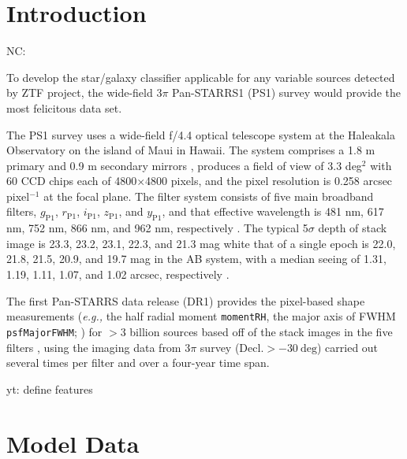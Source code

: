 \documentclass[twocolumn]{aastex62}
\newcommand{\yutaro}[1]{{\color{red} yt: {#1}}}
\newcommand{\NC}[1]{{\color{brown} NC: {#1}}}
\begin{document}

\section{Introduction}\label{sec:intro}

\NC{
To develop the star/galaxy classifier applicable for any variable sources detected by ZTF project, 
the wide-field 3$\pi$ Pan-STARRS1 (PS1) survey \citep{Chambers16} 
would provide the most felicitous data set. 

The PS1 survey uses a wide-field f/4.4 optical telescope system 
at the Haleakala Observatory on the island of Maui in Hawaii. 
The system comprises a 1.8 m primary and 0.9 m secondary mirrors \citep{Hodapp04}, 
produces a field of view of 3.3 deg$^2$ with 60 CCD chips each of 4800$\times$4800 pixels, 
and the pixel resolution is 0.258 arcsec pixel$^{-1}$ at the focal plane. 
The filter system consists of five main broadband filters, 
$g_{\mathrm{P1}}$, $r_{\mathrm{P1}}$, $i_{\mathrm{P1}}$, $z_{\mathrm{P1}}$, and $y_{\mathrm{P1}}$, 
and that effective wavelength is 481 nm, 617 nm, 752 nm, 866 nm, and 962 nm, 
respectively \citep{Tonry12, Schlafly12}. 
The typical 5$\sigma$ depth of stack image is 23.3, 23.2, 23.1, 22.3, and 21.3 mag 
white that of a single epoch is 22.0, 21.8, 21.5, 20.9, and 19.7 mag in the AB system, 
with a median seeing of 1.31, 1.19, 1.11, 1.07, and 1.02 arcsec, respectively \citep{Chambers16}. 

The first Pan-STARRS data release (DR1) provides the pixel-based shape measurements 
({\it e.g.,} the half radial moment \texttt{momentRH}, the major axis of FWHM \texttt{psfMajorFWHM}; 
\citealt{Flewelling16}) 
for $>$3 billion sources based off of the stack images in the five filters \citep{Magnier16b}, 
using the imaging data from 3$\pi$ survey ($\mathrm{Decl.}>-30\ \mathrm{deg}$) 
carried out several times per filter and over a four-year time span. 




}

\yutaro{define features}

\section{Model Data}\label{sec:model_data}
\end{document}
